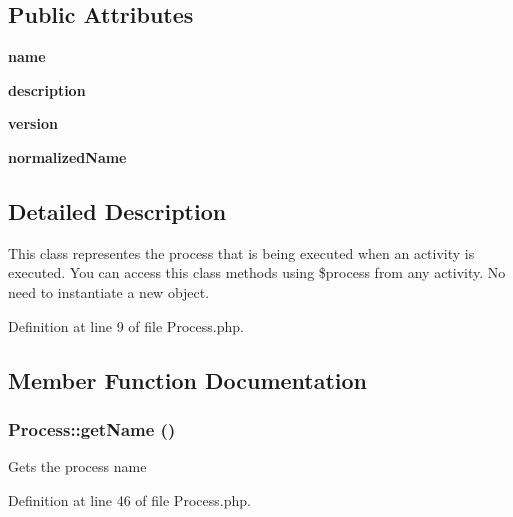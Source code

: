 \subsection*{Public Attributes}
\begin{CompactItemize}
\item 
{}
{\bf name}\label{classProcess_m0}

\item 
{}
{\bf description}\label{classProcess_m1}

\item 
{}
{\bf version}\label{classProcess_m2}

\item 
{}
{\bf normalized\-Name}\label{classProcess_m3}

\end{CompactItemize}


\subsection{Detailed Description}
This class representes the process that is being executed when an activity is executed. You can access this class methods using \$process from any activity. No need to instantiate a new object. 



Definition at line 9 of file Process.php.

\subsection{Member Function Documentation}
\subsubsection{\setlength{\rightskip}{0pt plus 5cm}Process::get\-Name ()}\label{classProcess_a3}


Gets the process name

Definition at line 46 of file Process.php.
